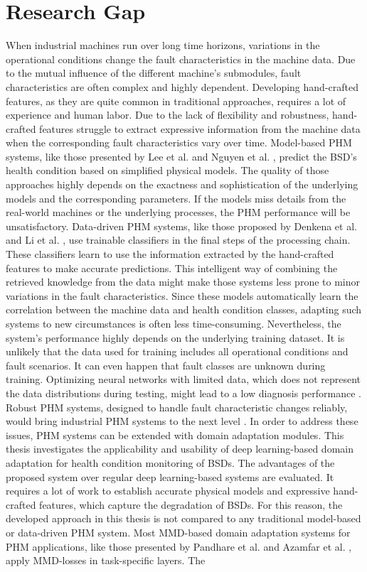 \section{Research Gap}
When industrial machines run over long time horizons, variations in the operational conditions change the fault characteristics in the machine data. Due to the mutual influence of the different machine's submodules, fault characteristics are often complex and highly dependent. Developing hand-crafted features, as they are quite common in traditional approaches, requires a lot of experience and human labor. Due to the lack of flexibility and robustness, hand-crafted features struggle to extract expressive information from the machine data when the corresponding fault characteristics vary over time. Model-based PHM systems, like those presented by Lee et al. \cite{Lee2015} and Nguyen et al. \cite{NGUYEN2019},  predict the BSD's health condition based on simplified physical models. The quality of those approaches highly depends on the exactness and sophistication of the underlying models and the corresponding parameters. If the models miss details from the real-world machines or the underlying processes, the PHM performance will be unsatisfactory. Data-driven PHM systems, like those proposed by Denkena et al. \cite{Denkena2021} and Li et al. \cite{LiPin2018}, use trainable classifiers in the final steps of the processing chain. These classifiers learn to use the information extracted by the hand-crafted features to make accurate predictions. This intelligent way of combining the retrieved knowledge from the data might make those systems less prone to minor variations in the fault characteristics. Since these models automatically learn the correlation between the machine data and health condition classes, adapting such systems to new circumstances is often less time-consuming. Nevertheless, the system's performance highly depends on the underlying training dataset. It is unlikely that the data used for training includes all operational conditions and fault scenarios. It can even happen that fault classes are unknown during training. Optimizing neural networks with limited data, which does not represent the data distributions during testing, might lead to a low diagnosis performance \cite{AZAMFAR2020103932}. Robust PHM systems, designed to handle fault characteristic changes reliably, would bring industrial PHM systems to the next level \cite{Michau2017}. In order to address these issues, PHM systems can be extended with domain adaptation modules. This thesis investigates the applicability and usability of deep learning-based domain adaptation for health condition monitoring of BSDs. The advantages of the proposed system over regular deep learning-based systems are evaluated. It requires a lot of work to establish accurate physical models and expressive hand-crafted features, which capture the degradation of BSDs. For this reason, the developed approach in this thesis is not compared to any traditional model-based or data-driven PHM system. Most MMD-based domain adaptation systems for PHM applications, like those presented by Pandhare et al. \cite{Pandhare2021} and Azamfar et al. \cite{AZAMFAR2020103932}, apply MMD-losses in task-specific layers. The 